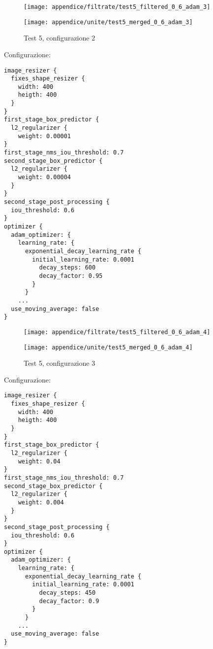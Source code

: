 \newpage
\begin{figure}[H]  
    \begin{minipage}{.5\columnwidth}  
        \centering  
        \texttt{[image: appendice/filtrate/test5\_filtered\_0\_6\_adam\_3]}  
    \end{minipage}%
    \begin{minipage}{0.5\columnwidth}  
        \centering  
        \texttt{[image: appendice/unite/test5\_merged\_0\_6\_adam\_3]}  
    \end{minipage}  
    \caption{Test 5, configurazione 2}
\end{figure}%
Configurazione:
\begin{multicols}{2}
    \begin{lstlisting}
image_resizer {
  fixes_shape_resizer {
    width: 400
    heigth: 400
  }
}
first_stage_box_predictor {
  l2_regularizer {
    weight: 0.00001
}
first_stage_nms_iou_threshold: 0.7
second_stage_box_predictor {
  l2_regularizer {
    weight: 0.00004
  }
}
second_stage_post_processing {
  iou_threshold: 0.6
}
optimizer {
  adam_optimizer: {
    learning_rate: {
      exponential_decay_learning_rate {
        initial_learning_rate: 0.0001
          decay_steps: 600
          decay_factor: 0.95
        }
      }
    ...
  use_moving_average: false
}
    \end{lstlisting}
\end{multicols}

\newpage
\begin{figure}[H]  
    \begin{minipage}{.5\columnwidth}  
        \centering  
        \texttt{[image: appendice/filtrate/test5\_filtered\_0\_6\_adam\_4]}  
    \end{minipage}%
    \begin{minipage}{0.5\columnwidth}  
        \centering  
        \texttt{[image: appendice/unite/test5\_merged\_0\_6\_adam\_4]}  
    \end{minipage}  
    \caption{Test 5, configurazione 3}
\end{figure}%
Configurazione:
\begin{multicols}{2}
    \begin{lstlisting}
image_resizer {
  fixes_shape_resizer {
    width: 400
    heigth: 400
  }
}
first_stage_box_predictor {
  l2_regularizer {
    weight: 0.04
}
first_stage_nms_iou_threshold: 0.7
second_stage_box_predictor {
  l2_regularizer {
    weight: 0.004
  }
}
second_stage_post_processing {
  iou_threshold: 0.6
}
optimizer {
  adam_optimizer: {
    learning_rate: {
      exponential_decay_learning_rate {
        initial_learning_rate: 0.0001
          decay_steps: 450
          decay_factor: 0.9
        }
      }
    ...
  use_moving_average: false
}
    \end{lstlisting}
\end{multicols}

